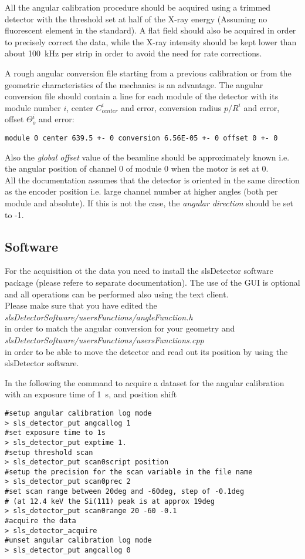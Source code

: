 All the angular calibration procedure should be acquired using a trimmed detector with the threshold set at half of the X-ray energy (Assuming no fluorescent element in the standard). A flat field should also be acquired in order to precisely correct the data, while the X-ray intensity should be kept lower than about 100~kHz per strip in order to avoid the need for rate corrections.

A rough angular conversion file starting from a previous calibration or from the geometric characteristics of the mechanics is an advantage. The angular conversion file should contain a line for each module of the detector with its module number $i$, center  $C_{center}^{i}$ and error, conversion radius $p/R^i$ and error, offset $\Theta_o^i$ and error:
\begin{verbatim}
module 0 center 639.5 +- 0 conversion 6.56E-05 +- 0 offset 0 +- 0
\end{verbatim}
Also the \textit{global offset} value of the beamline should be approximately known i.e. the angular position of channel 0 of module 0 when the motor is set at 0. \\
All the documentation assumes that the detector is oriented in the same direction as the encoder position i.e. large channel number at higher angles (both per module and absolute). If this is not the case, the \textit{angular direction} should be set to -1. 

\subsection{Software}

For the acquisition ot the data you need to install the slsDetector software package (please refere to separate documentation). The use of the GUI is optional and all operations can be performed also using the text client.\\

Please make sure that you have edited the \\
\textit{slsDetectorSoftware/usersFunctions/angleFunction.h} \\
in order to match the angular conversion for your geometry and \\
\textit{slsDetectorSoftware/usersFunctions/usersFunctions.cpp} \\
in order to be able to move the detector and read out its position by using the slsDetector software.

In the following the command to acquire a dataset for the angular calibration with an exposure time of 1~s, and position shift 
\begin{verbatim}
#setup angular calibration log mode
> sls_detector_put angcallog 1 
#set exposure time to 1s
> sls_detector_put exptime 1. 
#setup threshold scan
> sls_detector_put scan0script position 
#setup the precision for the scan variable in the file name
> sls_detector_put scan0prec 2 
#set scan range between 20deg and -60deg, step of -0.1deg
# (at 12.4 keV the Si(111) peak is at approx 19deg
> sls_detector_put scan0range 20 -60 -0.1 
#acquire the data
> sls_detector_acquire
#unset angular calibration log mode
> sls_detector_put angcallog 0
\end{verbatim}

